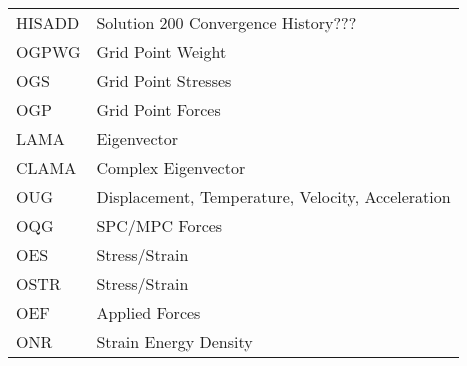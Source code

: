  \begin{tabular}{ll}
    HISADD   & Solution 200 Convergence History??? \\
    OGPWG    & Grid Point Weight      \\
    OGS      & Grid Point Stresses    \\
    OGP      & Grid Point Forces      \\

    LAMA     & Eigenvector            \\
    CLAMA    & Complex Eigenvector    \\

    OUG      & Displacement, Temperature, Velocity, Acceleration   \\
    OQG      & SPC/MPC Forces                                      \\
    OES      & Stress/Strain          \\
    OSTR     & Stress/Strain          \\
    OEF      & Applied Forces         \\
    ONR      & Strain Energy Density  \\
\end {tabular}


